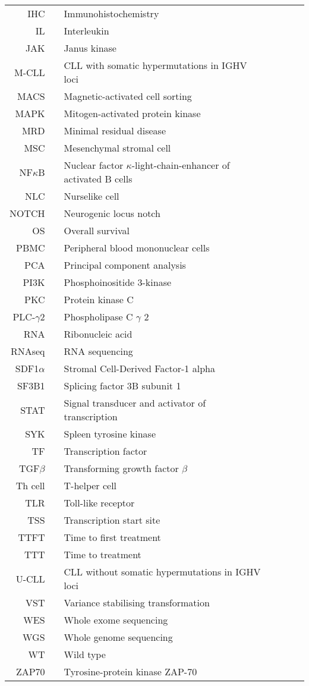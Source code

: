\documentclass[11pt, a4paper, twosided]{book}
\begin{document}
\newpage   
\begin{tabular}{rp{0.2cm}lp{1cm}rp{0.2cm}l}
    
  IHC & & Immunohistochemistry \\
    IL & & Interleukin \\
    JAK & & Janus kinase \\
    M-CLL & & CLL with somatic hypermutations in IGHV loci \\
    MACS & & Magnetic-activated cell sorting \\
    MAPK & & Mitogen-activated protein kinase  \\
    MRD & & Minimal residual disease  \\
    MSC & & Mesenchymal stromal cell  \\
    NF$\kappa$B & & Nuclear factor $\kappa$-light-chain-enhancer of activated B cells \\
    NLC & & Nurselike cell  \\
    NOTCH & & Neurogenic locus notch  \\
    OS & & Overall survival \\
    PBMC & & Peripheral blood mononuclear cells \\
    PCA & & Principal component analysis \\
    PI3K & & Phosphoinositide 3-kinase \\
    PKC & & Protein kinase C \\
    PLC-$\gamma$2 & & Phospholipase C $\gamma$ 2 \\
    RNA & & Ribonucleic acid  \\
    RNAseq & & RNA sequencing \\
    SDF1$\alpha$ & & Stromal Cell-Derived Factor-1 alpha  \\
    SF3B1 & & Splicing factor 3B subunit 1 \\
    STAT & & Signal transducer and activator of transcription \\
    SYK & & Spleen tyrosine kinase \\
    TF & & Transcription factor \\
    TGF$\beta$ & & Transforming growth factor $\beta$ \\
    Th cell & & T-helper cell \\
    TLR & & Toll-like receptor \\ 
    TSS & & Transcription start site \\
    TTFT & & Time to first treatment \\
    TTT & & Time to treatment \\
    U-CLL & & CLL without somatic hypermutations in IGHV loci \\
    VST & & Variance stabilising transformation \\
    WES & & Whole exome sequencing \\
    WGS & & Whole genome sequencing \\
    WT & & Wild type \\
    ZAP70 & & Tyrosine-protein kinase ZAP-70 \\
    
\end{tabular}
\end{document}
